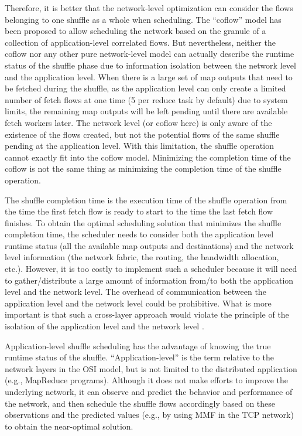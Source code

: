 \documentclass[10pt,journal,compsoc]{IEEEtran}
\begin{document}
Therefore, it is better that the network-level optimization can
consider the flows belonging to one shuffle as a whole when
scheduling.
The ``coflow'' model \cite{chowdhury2014efficient,
chowdhury2015efficient} has been proposed to allow scheduling the network based on
the granule of a collection of application-level correlated flows.
But nevertheless, neither the coflow nor any other pure network-level
model can actually describe the runtime status of the shuffle phase
due to information isolation between the network level and the
application level.
When there is a large set of map outputs that need to be fetched during
the shuffle, as the application level can only create a limited number
of fetch flows at one time (5 per reduce task by default)
due to system limits,
the remaining map outputs will be left pending until there are available
fetch workers later. 
The network level (or coflow here) is only aware of the existence of
the flows created, but not the potential flows of the same shuffle
pending at the application level.
With this limitation, the shuffle operation cannot exactly fit into the coflow model. 
Minimizing the completion time of the coflow is not the same thing as
minimizing the completion time of the shuffle operation.



The shuffle completion time is the execution time of the shuffle operation 
from the time the first fetch flow is ready to start to the time the last fetch flow 
finishes. 
To obtain the optimal scheduling solution that minimizes the shuffle
completion time, the scheduler needs to consider both the
application level runtime status (all the available map outputs and
destinations) and the network level information (the network fabric,
the routing, the bandwidth allocation, etc.).
However, it is too costly %
to implement such a scheduler
because it will need to gather/distribute a large amount of information
from/to both the application level and the network level.
The overhead of communication between the application level and the
network level could be prohibitive.
What is more important is that such a cross-layer approach would violate the
principle of the isolation of the application level and the network
level \cite{saltzer1984end}.

Application-level shuffle scheduling has the advantage of knowing
the true runtime status of the shuffle.
``Application-level'' is the term relative to the network layers in 
the OSI model, but is not limited to the distributed application (e.g., MapReduce programs). 
Although it does not make efforts to improve the underlying network, 
it can observe and predict the behavior and performance of the network, 
and then schedule the shuffle flows accordingly based on
these observations and the predicted values (e.g., by using MMF in the TCP
network) to obtain the near-optimal solution. 
\end{document}
